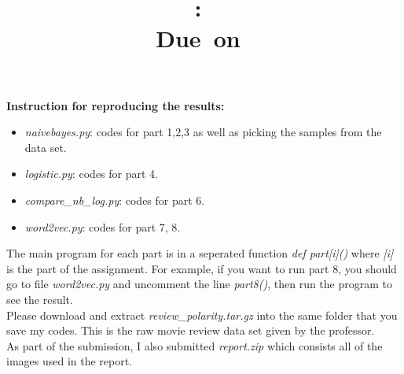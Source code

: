 \documentclass{article}
\title{
\vspace{2in}
\textmd{\textbf{\hmwkClass:\ \hmwkTitle}}\\
\normalsize\vspace{0.1in}\small{Due\ on\ \hmwkDueDate}\\
\vspace{0.1in}
\vspace{3in}
}
\author{\textbf{\hmwkAuthorName}}
\begin{document}
\maketitle
\clearpage

\textbf{Instruction for reproducing the results:}
\begin{itemize}
\item \textit{naivebayes.py}: codes for part 1,2,3 as well as picking the samples from the data set.
\item \textit{logistic.py}: codes for part 4. 
\item \textit{compare\_nb\_log.py}: codes for part 6.
\item \textit{word2vec.py}: codes for part 7, 8.
\end{itemize}
The main program for each part is in a seperated function \textit{def part[i]()} where \textit{[i]} is the part of the assignment. For example, if you want to run part 8, you should go to file \textit{word2vec.py} and uncomment the line \textit{part8()}, then run the program to see the result. \\

Please download and extract \textit{review\_polarity.tar.gz} into the same folder that you save my codes. This is the raw movie review data set given by the professor.\\ 

As part of the submission, I also submitted \textit{report.zip} which consists all of the images used in the report. \\
\end{document}
